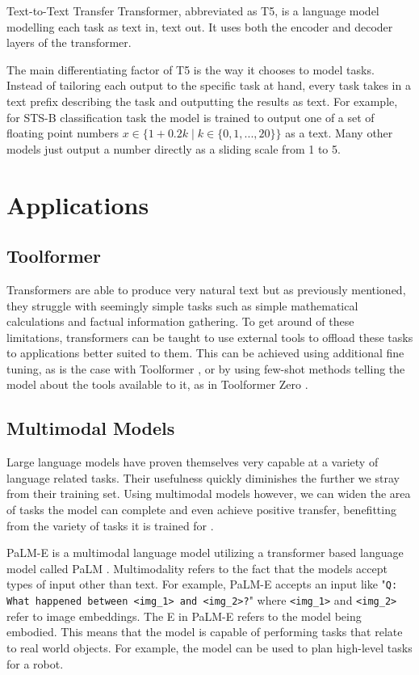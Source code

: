 \documentclass[twoside]{article}
\begin{document}
Text-to-Text Transfer Transformer, abbreviated as T5, is a language model modelling each
task as text in, text out. It uses both the encoder and decoder layers of the transformer.
\cite{raffel_exploring_2020}

The main differentiating factor of T5 is the way it chooses to model tasks. Instead of 
tailoring each output to the specific task at hand, every task takes in a text prefix
describing the task and outputting the results as text. For example, for STS-B classification
task the model is trained to output one of a set of floating point numbers 
$x \in \{ 1+0.2k \mid k \in \{ 0, 1, ..., 20\} \}$ as a text. Many other models just 
output a number directly as a sliding scale from 1 to 5. 

\section{Applications}

\subsection{Toolformer}
Transformers are able to produce very natural text but as previously mentioned, they struggle with seemingly
simple tasks such as simple mathematical calculations and factual information gathering.
To get around of these limitations, transformers can be taught to use external tools
to offload these tasks to applications better suited to them. \cite{schick_toolformer_2023} 
This can be achieved using additional fine tuning, as is the case with Toolformer
\cite{schick_toolformer_2023}, or by using few-shot methods telling the model 
about the tools available to it, as in Toolformer Zero \cite{minosvasilias_markus_toolformer_2023}.

\subsection{Multimodal Models}
Large language models have proven themselves very capable at a variety of language related
tasks. Their usefulness quickly diminishes the further we stray from their training set.
Using multimodal models however, we can widen the area of tasks the model
can complete and even achieve positive transfer, benefitting from the variety of tasks
it is trained for \cite{driess_palm-e_2023}. 

PaLM-E is a multimodal language model utilizing a transformer based language model called
PaLM \cite{chowdhery_palm_2022,driess_palm-e_2023}. Multimodality refers to the fact that
the models accept types of input other than text. For example, PaLM-E accepts an input like
"\texttt{Q: What happened between <img\_1> and <img\_2>?}" \cite{driess_palm-e_2023} where
\texttt{<img\_1>} and \texttt{<img\_2>} refer to image embeddings. The E in PaLM-E refers to
the model being embodied. This means that the model is capable of performing tasks that
relate to real world objects. For example, the model can be used to plan high-level tasks
for a robot. \cite{driess_palm-e_2023}
\end{document}
